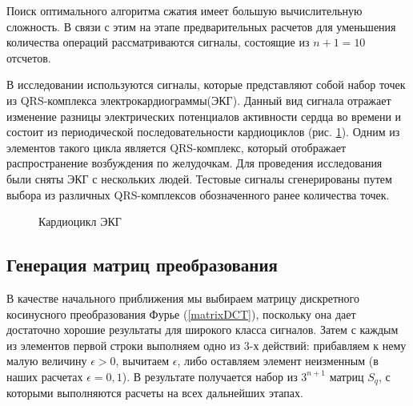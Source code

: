 \documentclass[11pt, oneside, a4paper]{article}
\begin{document}
Поиск оптимального алгоритма сжатия имеет большую вычислительную сложность. В связи с этим на этапе предварительных расчетов для уменьшения количества операций рассматриваются сигналы, состоящие из $n+1=10$ отсчетов. 

В исследовании используются сигналы, которые представляют собой набор точек из QRS-комплекса электрокардиограммы(ЭКГ). Данный вид сигнала отражает изменение разницы электрических потенциалов активности сердца во времени и состоит из периодической последовательности кардиоциклов (рис. \ref{qsr-complex}). Одним из элементов такого цикла является QRS-комплекс, который отображает распространение возбуждения по желудочкам. Для проведения исследования были сняты ЭКГ с нескольких людей. Тестовые сигналы сгенерированы путем выбора из различных QRS-комплексов обозначенного ранее количества точек.

\begin{figure}[h]
	\caption{Кардиоцикл ЭКГ}
	\label{qsr-complex}
\end{figure}

\subsection{Генерация матриц преобразования}

В качестве начального приближения мы выбираем матрицу дискретного косинусного преобразования Фурье (\ref{matrixDCT}), поскольку она дает достаточно хорошие результаты для широкого класса сигналов. Затем с каждым из элементов первой строки выполняем одно из 3-х действий: прибавляем к нему малую величину $\epsilon>0$, вычитаем $\epsilon$, либо оставляем элемент неизменным (в наших расчетах $\epsilon=0,1$). В результате получается набор из $3^{n+1}$ матриц $S_q$, с которыми выполняются расчеты на всех дальнейших этапах.
\end{document}

